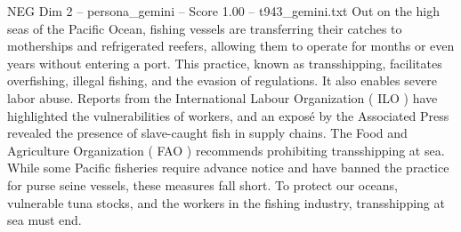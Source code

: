 \begin{textsample}{NEG Dim 2 – persona\_gemini – Score 1.00 – t943\_gemini.txt}  \label{ex:f2_neg_018}
Out on the high seas of the Pacific Ocean, fishing vessels are transferring their catches to motherships and refrigerated reefers, allowing them to operate for months or even years without entering a port.
This practice, known as transshipping, facilitates overfishing, illegal fishing, and the evasion of regulations.
It also enables severe labor abuse.
Reports from the International Labour Organization ( ILO ) have highlighted the vulnerabilities of workers, and an exposé by the Associated Press revealed the presence of slave-caught fish in supply chains.
The Food and Agriculture Organization ( FAO ) recommends prohibiting transshipping at sea.
While some Pacific fisheries require advance notice and have banned the practice for purse seine vessels, these measures fall short.
To protect our oceans, vulnerable tuna stocks, and the workers in the fishing industry, transshipping at sea must end.

\end{textsample}
